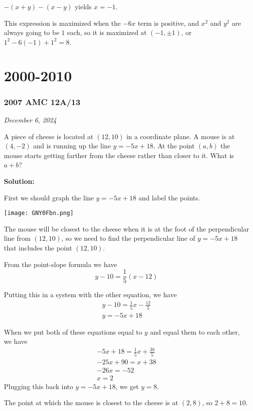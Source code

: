 \documentclass[../mathproblems.tex]{subfiles}
\begin{document}
$-(x+y)-(x-y)$ yields $x=-1$.

This expression is maximized when the $-6x$ term is positive, and $x^2$ and $y^2$ are always going to be $1$ each, so it is maximized at $(-1,\pm 1)$, or $1^2-6(-1)+1^2=\boxed{8}$.

\noindent\hrulefill
\section{2000-2010}
\subsubsection*{2007 AMC 12A/13}
\textit{December 6, 2024}

A piece of cheese is located at $(12,10)$ in a coordinate plane. A mouse is at $(4,-2)$ and is running up the line $y=-5x+18$. At the point $(a,b)$ the mouse starts getting farther from the cheese rather than closer to it. What is $a+b$? 

\textbf{Solution:}

First we should graph the line $y=-5x+18$ and label the points.
\begin{center}
    \texttt{[image: GNY0Fbn.png]}
\end{center}

The mouse will be closest to the cheese when it is at the foot of the perpendicular line from $(12,10)$, so we need to find the perpendicular line of $y=-5x+18$ that includes the point $(12,10)$.

From the point-slope formula we have 
\[ y-10 = \frac{1}{5}(x-12) \]

Putting this in a system with the other equation, we have 
\begin{align*}
y - 10 = \frac{1}{5}x - \frac{12}{5} \\ 
y = -5x+18
\end{align*}

When we put both of these equations equal to $y$ and equal them to each other, we have  
\begin{align*}
-5x+18 = \frac{1}{5}x + \frac{38}{5}\\
-25x + 90 = x + 38 \\
-26x = -52 \\
x = 2
\end{align*}
Plugging this back into $y=-5x+18$, we get $y=8$.

The point at which the mouse is closest to the cheese is at $(2,8)$, so $2+8 = \boxed{10}$.
\end{document}
